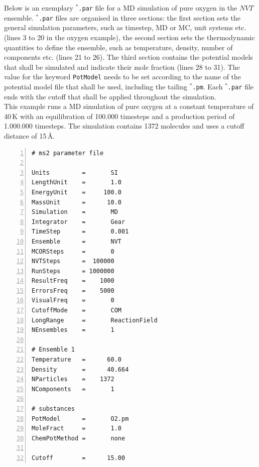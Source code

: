 Below is an exemplary  \texttt{$^{*}$\hspace{-3pt}.par} file for a MD simulation of pure oxygen in the $NVT$ ensemble.  \texttt{$^{*}$\hspace{-3pt}.par} files are organised in three sections: the first section sets the general simulation parameters, such as timestep, MD or MC, unit systems etc. (lines 3 to 20 in the oxygen example), the second section sets the thermodynamic quantities to define the ensemble, such as temperature, density, number of components etc. (lines 21 to 26). The third section contains the potential models that shall be simulated and indicate their mole fraction (lines 28 to 31). The value for the keyword \texttt{PotModel} needs to be set according to the name of the potential model file that shall be used, including the tailing \texttt{$^{*}$\hspace{-3pt}.pm}. Each \texttt{$^{*}$\hspace{-3pt}.par} file ends with the cutoff that shall be applied throughout the simulation.\\
This example runs a MD simulation of pure oxygen at a constant temperature of 40\,K with an equilibration of 100.000 timesteps and a production period of 1.000.000 timesteps. The simulation contains 1372 molecules and uses a cutoff distance of 15\,\AA.

\vspace{0.7cm}
\begin{Verbatim}[frame=single,framesep=6.5mm,label=\fbox{*.par file for O$_2$ simulation},numbers=left,numbersep=-10pt,xrightmargin=5cm]
# ms2 parameter file 

Units         =       SI
LengthUnit    =       1.0
EnergyUnit    =     100.0
MassUnit      =      10.0
Simulation    =       MD
Integrator    =       Gear
TimeStep      =       0.001
Ensemble      =       NVT
MCORSteps     =       0
NVTSteps      =  100000
RunSteps      = 1000000
ResultFreq    =    1000
ErrorsFreq    =    5000
VisualFreq    =       0
CutoffMode    =       COM
LongRange     =       ReactionField
NEnsembles    =       1

# Ensemble 1
Temperature   =      60.0
Density       =      40.664
NParticles    =    1372
NComponents   =       1

# substances
PotModel      =       O2.pm
MoleFract     =       1.0
ChemPotMethod =       none

Cutoff        =      15.00
\end{Verbatim}
\vspace{0.7cm}

